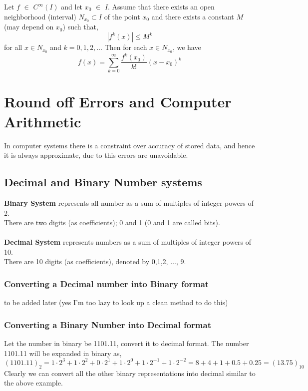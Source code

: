 \documentclass[../Main.tex]{subfiles}
\begin{document}
\thmp{}
{
	Let $f$ $\in$ $C^{\infty}(I)$ and let $x_0$ $\in$ $I$. Assume that there exists an open neighborhood (interval) $N_{x_0} \subset I$ of the point $x_0$ and there exists a constant $M$ (may depend on $x_0$) such that,
	\begin{equation}
		\left | f^{k}(x) \right | \leq M^k
	\end{equation}
	for all $x \in N_{x_0}$ and $k = 0, 1, 2, \dots$ Then for each $x \in N_{x_0}$, we have
	\begin{equation}
		f(x) = \sum_{k=0}^{\infty} \frac{f^k(x_0)}{k!}(x-x_0)^k
	\end{equation}
}
{}

\section{Round off Errors and Computer Arithmetic}
In computer systems there is a constraint over accuracy of stored data, and hence it is always approximate, due to this errors are unavoidable.

\subsection{Decimal and Binary Number systems}
\textbf{Binary System} represents all number as a sum of multiples of integer powers of 2.\\
There are two digits (as coefficients); 0 and 1 (0 and 1 are called bits).\\\\
\textbf{Decimal System} represents numbers as a sum of multiples of integer powers of 10.\\
There are 10 digits (as coefficients), denoted by 0,1,2, $\dots$, 9.


\subsubsection{Converting a Decimal number into Binary format}
to be added later (yes I'm too lazy to look up a clean method to do this)

\subsubsection{Converting a Binary Number into Decimal format}
\exm
{Let the number in binary be 1101.11, convert it to decimal format.}
{
	The number 1101.11 will be expanded in binary as,
	\begin{equation*}
		(1101.11)_2 = 1 \cdot 2^3 + 1 \cdot 2^2 + 0 \cdot 2^1 + 1 \cdot 2^0 + 1 \cdot 2^{-1} + 1 \cdot 2^{-2} = 8 + 4 + 1 + 0.5 + 0.25 = (13.75)_{10}
	\end{equation*}
}
Clearly we can convert all the other binary representations into decimal similar to the above example.
\end{document}
